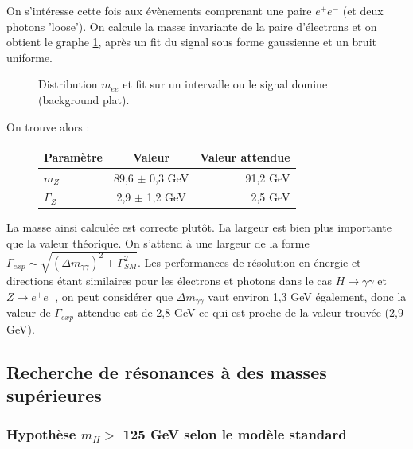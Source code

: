 \documentclass[11pt]{article} %
\begin{document}
On s'intéresse cette fois aux évènements comprenant une paire $e^+e^-$ (et deux photons 'loose'). On calcule la masse invariante de la paire d'électrons et on obtient le graphe \ref{fig:distribution_mee}, après un fit du signal sous forme gaussienne et un bruit uniforme. 

\begin{figure}[H]
\centering
  \caption{Distribution $m_{ee}$ et fit sur un intervalle ou le signal domine (background plat).  }
\label{fig:distribution_mee}
 \resizebox{.9\linewidth}{!}{}
\end{figure}


On trouve alors :

\begin{figure}[H]
\centering
\begin{tabular}{|l|c|r|} 
   \hline
   Paramètre & Valeur & Valeur attendue \\
    \hline
   $m_Z$ & 89,6 $\pm$ 0,3 GeV & 91,2 GeV\\
  \hline
   $\Gamma_Z$ & 2,9 $\pm$ 1,2 GeV & 2,5 GeV \\
 \hline
\end{tabular}
\end{figure}

La masse ainsi calculée est correcte plutôt. La largeur est bien plus importante que la valeur théorique. On s'attend à une largeur de la forme $\Gamma_{exp} \sim \sqrt{(\Delta m_{\gamma \gamma})^2 + \Gamma_{SM}^2}$. Les performances de résolution en énergie et directions étant similaires pour les électrons et photons dans le cas $H \to \gamma \gamma$ et $Z\to e^+e^-$, on peut considérer que $\Delta m_{\gamma \gamma} $ vaut environ 1,3 GeV également, donc la valeur de $\Gamma_{exp}$ attendue est de 2,8 GeV ce qui est proche de la valeur trouvée (2,9 GeV).

\subsection{Recherche de résonances à des masses supérieures }

\subsubsection{Hypothèse $m_H >$ 125 GeV selon le modèle standard}
\end{document}
